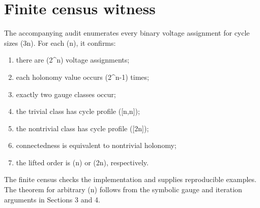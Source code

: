 \section{Finite census witness}

The accompanying audit enumerates every binary voltage assignment for cycle
sizes (3\leq n). For each (n), it confirms:
\begin{enumerate}
\item there are (2^n) voltage assignments;
\item each holonomy value occurs (2^{n-1}) times;
\item exactly two gauge classes occur;
\item the trivial class has cycle profile ([n,n]);
\item the nontrivial class has cycle profile ([2n]);
\item connectedness is equivalent to nontrivial holonomy;
\item the lifted order is (n) or (2n), respectively.
\end{enumerate}

The finite census checks the implementation and supplies reproducible examples.
The theorem for arbitrary (n) follows from the symbolic gauge and iteration
arguments in Sections 3 and 4.

